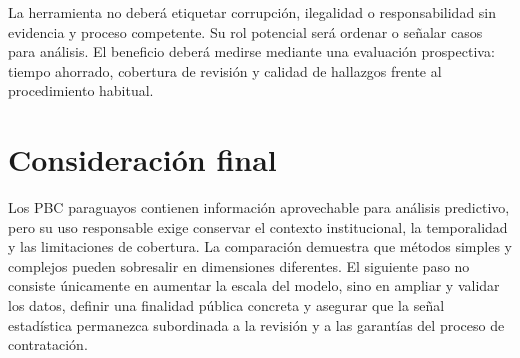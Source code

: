 La herramienta no deberá etiquetar corrupción, ilegalidad o responsabilidad sin evidencia y proceso competente. Su rol potencial será ordenar o señalar casos para análisis. El beneficio deberá medirse mediante una evaluación prospectiva: tiempo ahorrado, cobertura de revisión y calidad de hallazgos frente al procedimiento habitual.

\section{Consideración final}

Los PBC paraguayos contienen información aprovechable para análisis predictivo, pero su uso responsable exige conservar el contexto institucional, la temporalidad y las limitaciones de cobertura. La comparación demuestra que métodos simples y complejos pueden sobresalir en dimensiones diferentes. El siguiente paso no consiste únicamente en aumentar la escala del modelo, sino en ampliar y validar los datos, definir una finalidad pública concreta y asegurar que la señal estadística permanezca subordinada a la revisión y a las garantías del proceso de contratación.
